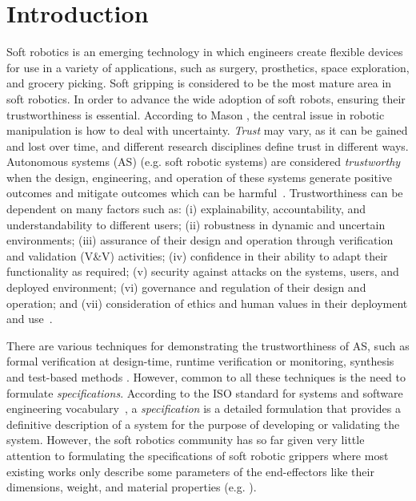 \documentclass[lettersize,journal]{IEEEtran}
\begin{document}
\section{Introduction}\label{introduction}
Soft robotics is an emerging technology in which engineers create flexible devices for use in a variety of applications, such as surgery, prosthetics, space exploration, and grocery picking. 
Soft gripping is considered to be the most mature area in soft robotics. 
In order to advance the wide adoption of soft robots, ensuring their trustworthiness is essential. 
According to Mason \cite{Mason1985}, the central issue in robotic manipulation is how to deal with uncertainty. %
\emph{Trust} may vary, as it can be gained and lost over time, and different research disciplines define trust in different ways. 
Autonomous systems (AS) (e.g. soft robotic systems) are considered \emph{trustworthy} when the design, engineering, and operation of these systems generate positive outcomes and mitigate outcomes which can be harmful~\cite{Naiseh2022}.
Trustworthiness can be dependent on many factors such as: (i) explainability, accountability, and understandability to different users; (ii) robustness in dynamic and uncertain environments; (iii) assurance of their design and operation through verification and validation (V\&V) activities; (iv) confidence in their ability to adapt their functionality as required; (v) security against attacks on the systems, users, and deployed environment; (vi) governance and regulation of their design and operation; and (vii) consideration of ethics and human values in their deployment and use~\cite{Naiseh2022}. 


There are various techniques for demonstrating the trustworthiness of AS, such as formal verification at design-time, runtime verification or monitoring, synthesis and test-based methods \cite{Abeywickrama2022}. 
However, common to all these techniques is the need to formulate \emph{specifications}. 	
According to the ISO standard for systems and software engineering vocabulary~\cite{ISO24765:2017}, a \emph{specification} is a detailed formulation that provides a definitive description of a system for the purpose of developing or validating the system. 
However, the soft robotics community has so far given very little attention to formulating the specifications of soft robotic grippers where most existing works only describe some parameters of the end-effectors like their dimensions, weight, and material properties (e.g. \cite{Hong2022,Bhattacharya2019,Tadakuma2020,Loh2014,Nishikawa2019,Mohan2020}).  
\end{document}
